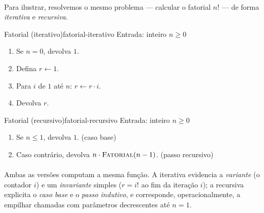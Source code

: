 \documentclass[12pt,a4paper]{article}
\begin{document}
\paragraph{}
Para ilustrar, resolvemos o mesmo problema — calcular o fatorial \(n!\) — de forma \emph{iterativa} e \emph{recursiva}.

\begin{algobox}{Fatorial (iterativo)}{fatorial-iterativo}
Entrada: inteiro \(n\ge 0\)
\begin{enumerate}\setlength{\itemsep}{2pt}
    \item Se \(n=0\), devolva \(1\).
    \item Defina \(r\leftarrow 1\).
    \item Para \(i\) de \(1\) até \(n\): \(r\leftarrow r\cdot i\).
    \item Devolva \(r\).
\end{enumerate}
\end{algobox}

\begin{algobox}{Fatorial (recursivo)}{fatorial-recursivo}
Entrada: inteiro \(n\ge 0\)
\begin{enumerate}\setlength{\itemsep}{2pt}
    \item Se \(n\le 1\), devolva \(1\). \hfill (caso base)
    \item Caso contrário, devolva \(n\cdot \textsc{Fatorial}(n-1)\). \hfill (passo recursivo)
\end{enumerate}
\end{algobox}

\paragraph{}
Ambas as versões computam a mesma função. A iterativa evidencia a \emph{variante} (o contador \(i\)) e um \emph{invariante} simples (\(r= i!\) ao fim da iteração \(i\)); a recursiva explicita o \emph{caso base} e o \emph{passo indutivo}, e corresponde, operacionalmente, a empilhar chamadas com parâmetros decrescentes até \(n=1\).    
\end{document}
